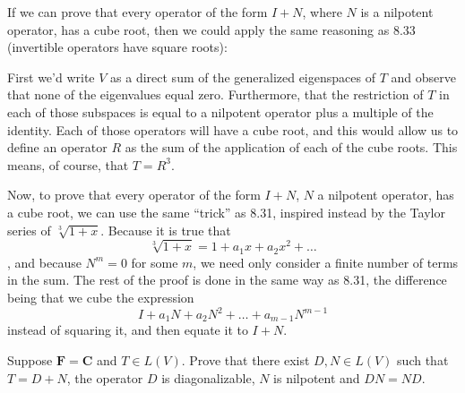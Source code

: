\begin{solution}

    If we can prove that every operator of the form $I + N$, where $N$ is a nilpotent operator, has a cube root, then we could apply the same reasoning as 8.33 (invertible operators have square roots): 
    
    First we'd write $V$ as a direct sum of the generalized eigenspaces of $T$ and observe that none of the eigenvalues equal zero. Furthermore, that the restriction of $T$ in each of those subspaces is equal to a nilpotent operator plus a multiple of the identity. Each of those operators will have a cube root, and this would allow us to define an operator $R$ as the sum of the application of each of the cube roots. This means, of course, that $T = R^3$.

    Now, to prove that every operator of the form $I + N$, $N$ a nilpotent operator, has a cube root, we can use the same ``trick'' as 8.31, inspired instead by the Taylor series of $\sqrt[3]{1+x}$. Because it is true that
    $$\sqrt[3]{1+x} = 1 + a_1 x + a_2 x^2 + \ldots$$
    , and because $N^m = 0$ for some $m$, we need only consider a finite number of terms in the sum. The rest of the proof is done in the same way as 8.31, the difference being that we cube the expression
    $$I + a_1 N + a_2 N^2 + \ldots + a_{m-1}N^{m-1}$$
    instead of squaring it, and then equate it to $I+N$.
\end{solution}

\begin{exercise}{10}
    Suppose $\mathbf{F} = \mathbf{C}$ and $T \in L(V)$. Prove that there exist $D, N \in L(V)$ such that $T=D+N$, the operator $D$ is diagonalizable, $N$ is nilpotent and $DN = ND$.
\end{exercise}

